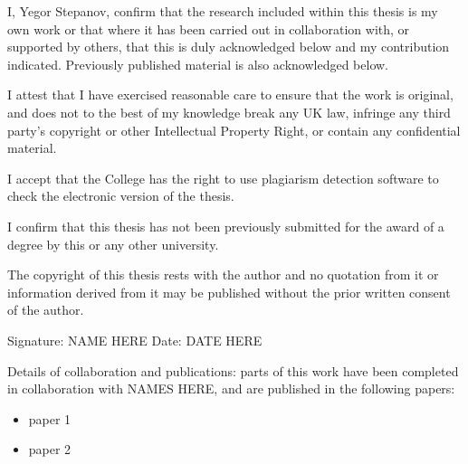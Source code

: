
\begin{declaration} %

I, Yegor Stepanov, confirm that the research included within this thesis is my own work or that where it has been carried 
out in collaboration with, or supported by others, that this is duly acknowledged below and my contribution indicated. 
Previously published material is also acknowledged below.

I attest that I have exercised reasonable care to ensure that the work is original, 
and does not to the best of my knowledge break any UK law, infringe any third party’s 
copyright or other Intellectual Property Right, or contain any confidential material.

I accept that the College has the right to use plagiarism detection software to check the electronic version of the thesis.

I confirm that this thesis has not been previously submitted for the award of a degree by this or any other university.

The copyright of this thesis rests with the author and no quotation from it or information derived from it may be 
published without the prior written consent of the author.

Signature: NAME HERE \quad
Date: DATE HERE

Details of collaboration and publications:
parts of this work have been completed in collaboration with NAMES HERE, and are published in the
following papers:
\begin{itemize}
 \item  paper 1
 \item paper 2
\end{itemize}








\end{declaration}


